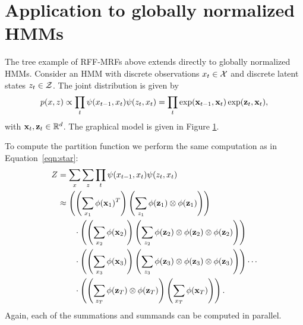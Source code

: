 \documentclass{article}
\begin{document}
\section{Application to globally normalized HMMs}
The tree example of RFF-MRFs above extends directly to globally normalized HMMs.
Consider an HMM with discrete observations $x_t \in \mathcal{X}$
and discrete latent states $z_t\in\mathcal{Z}$.
The joint distribution is given by
\begin{equation}
p(x,z) \propto \prod_t \psi(x_{t-1}, x_t) \psi(z_t, x_t)
= \prod_t \exp(\mathbf{x}_{t-1}, \mathbf{x}_t) \exp(\mathbf{z}_t, \mathbf{x}_t),
\end{equation}
with $\mathbf{x}_t,\mathbf{z}_t\in\mathbb{R}^d$.
The graphical model is given in Figure \ref{fig:hmm}.
\begin{figure}[htb!]
\centering
{}
\caption{
\label{fig:hmm}
}
\end{figure}

To compute the partition function we perform the same computation
as in Equation~\ref{eqn:star}:
\begin{equation}
\begin{aligned}
Z &= \sum_x\sum_z \prod_t \psi(x_{t-1}, x_t)\psi(z_t, x_t)\\
&\approx
\left(\left(\sum_{x_1} \phi(\mathbf{x}_1)^T \right) \left(\sum_{z_1} \phi(\mathbf{z}_1)\otimes \phi(\mathbf{z}_1) \right)\right)\\
&\qquad \cdot \left(\left(\sum_{x_2} \phi(\mathbf{x}_2) \right) \left(\sum_{z_2} \phi(\mathbf{z}_2)\otimes \phi(\mathbf{z}_2)\otimes\phi(\mathbf{z}_2) \right)\right)\\
&\qquad \cdot \left(\left(\sum_{x_3} \phi(\mathbf{x}_3) \right) \left(\sum_{z_3} \phi(\mathbf{z}_3)\otimes \phi(\mathbf{z}_3)\otimes\phi(\mathbf{z}_3) \right)\right)
\cdots\\
&\qquad \cdot \left(\left(\sum_{z_T} \phi(\mathbf{z}_T)\otimes \phi(\mathbf{z}_T) \right)\left(\sum_{x_T} \phi(\mathbf{x}_T) \right) \right).
\end{aligned}
\end{equation}
Again, each of the summations and summands can be computed in parallel.
\end{document}
